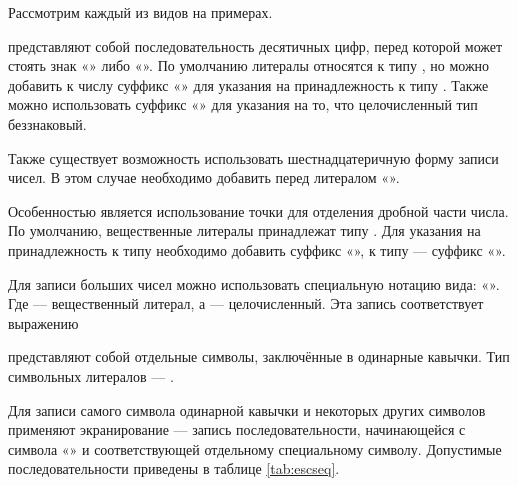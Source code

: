 Рассмотрим каждый из видов на примерах.


 представляют
собой последовательность десятичных цифр, перед которой может стоять
знак «\Lst{+}» либо «\Lst{-}». По умолчанию литералы относятся к
типу , но можно добавить к числу суффикс «» для
указания на принадлежность к типу . Также можно
использовать суффикс «» для указания на то, что
целочисленный тип беззнаковый. %

Также существует возможность использовать шестнадцатеричную форму
записи чисел. В этом случае необходимо добавить перед литералом
«».


Особенностью 
является использование точки для отделения дробной части числа. По
умолчанию, вещественные литералы принадлежат типу . Для
указания на принадлежность к типу  необходимо добавить
суффикс «», к типу  — суффикс «».

Для записи больших чисел можно использовать специальную нотацию вида:
«».  Где
 — вещественный литерал, а
 — целочисленный. Эта запись соответствует
выражению


 представляют собой
отдельные символы, заключённые в одинарные кавычки. Тип символьных
литералов — .

Для записи самого символа одинарной кавычки и некоторых других
символов применяют экранирование — запись последовательности,
начинающейся с символа «\Lst{\textbackslash{}}» и соответствующей
отдельному специальному символу. Допустимые последовательности
приведены в таблице \ref{tab:escseq}.

